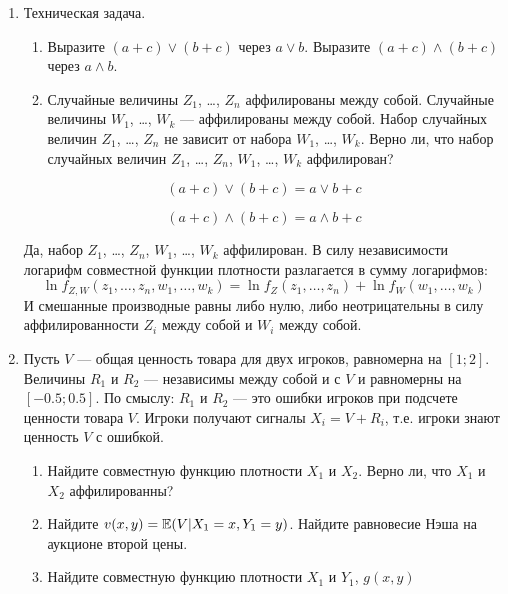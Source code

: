 \begin{enumerate}


\item Техническая задача.
\begin{enumerate}
\item Выразите $ (a+c)\vee (b+c) $ через $ a\vee b $. Выразите $ (a+c)\wedge (b+c) $ через $ a\wedge b $.
\item Случайные величины $ Z_{1} $, \ldots , $ Z_{n} $ аффилированы между собой. Случайные величины $ W_{1} $, \ldots , $ W_{k} $ --- аффилированы между собой. Набор случайных величин $ Z_{1} $, \ldots , $ Z_{n} $ не зависит от набора $ W_{1} $, \ldots , $ W_{k} $. Верно ли, что набор случайных величин $ Z_{1} $, \ldots , $ Z_{n} $, $ W_{1} $, \ldots , $ W_{k} $ аффилирован?
\end{enumerate}

\begin{equation}
(a+c)\vee (b+c)=a\vee b +c
\end{equation}

\begin{equation}
(a+c)\wedge (b+c)=a\wedge b +c
\end{equation}

Да, набор $ Z_{1} $, \ldots , $ Z_{n} $, $ W_{1} $, \ldots , $ W_{k} $ аффилирован. В силу независимости логарифм совместной функции плотности разлагается в сумму логарифмов:
\begin{equation}
\ln f_{Z,W}(z_{1},\ldots ,z_{n},w_{1},\ldots ,w_{k})= \ln f_{Z}(z_{1},\ldots ,z_{n})+\ln f_{W}(w_{1},\ldots ,w_{k})
\end{equation}
И смешанные производные равны либо нулю, либо неотрицательны в силу аффилированности $ Z_{i} $ между собой и $ W_{i} $ между собой.

\item Пусть $  V $ --- общая ценность товара для двух игроков, равномерна на $ [1;2] $. Величины $ R_{1} $ и $ R_{2} $ --- независимы между собой и с $ V $ и равномерны на $ [-0.5;0.5] $. По смыслу: $ R_{1} $ и $ R_{2} $ --- это ошибки игроков при подсчете ценности товара $ V $. Игроки получают сигналы $ X_{i}=V+R_{i} $, т.е. игроки знают ценность  $ V $ с ошибкой.
\begin{enumerate}
\item Найдите совместную функцию плотности $ X_{1} $ и $ X_{2} $. Верно ли, что $ X_{1} $ и $ X_{2} $ аффилированны?
\item Найдите $ v(x,y)=\mathbb{E}(V|X_{1}=x,Y_{1}=y) $. Найдите равновесие Нэша на аукционе второй цены.
\item Найдите совместную функцию плотности $ X_{1} $ и $ Y_{1} $, $ g(x,y) $
\end{enumerate} 


\end{enumerate}
